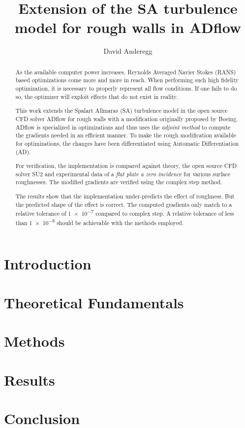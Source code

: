 \documentclass[a4paper, 10pt]{report}
\title{Extension of the SA turbulence model for rough walls in ADflow}
\author{David Anderegg}
\begin{document}
    


    \begin{abstract}
      As the available computer power increases, Reynolds Averaged Navier Stokes
(RANS) based optimizations come more and more in reach. When performing such
high fidelity optimization, it is necessary to properly represent all flow
conditions. If one fails to do so, the optimizer will exploit effects that do
not exist in reality.

      This work extends the Spalart Allmaras (SA) turbulence model in the open
source CFD solver ADflow for rough walls with a modification originally proposed
by Boeing. ADflow is specialized in optimizations and thus uses the
\textit{adjoint method} to compute the gradients needed in an efficient manner.
To make the rough modification available for optimizations, the changes have
been differentiated using Automatic Differentiation (AD).

    For verification, the implementation is compared against theory, the open
source CFD solver SU2 and experimental data of a \textit{flat plate a zero
incidence} for various surface roughnesses. The modified gradients are verified
using the complex step method.

    The results show that the implementation under-predicts the effect of
roughness. But the predicted shape of the effect is correct. The computed
gradients only match to a relative tolerance of \num{1e-7} compared to complex
step. A relative tolerance of less than \num{1e-8} should be achievable with the
methods employed.


    \end{abstract}

    \tableofcontents\clearpage


    \chapter{Introduction}
    

    \chapter{Theoretical Fundamentals}
    

    \chapter{Methods}
    


    \chapter{Results}
    


    \chapter{Conclusion}
    

    \listoffigures\clearpage
    \listoftables\clearpage


    \printbibliography
\end{document}
